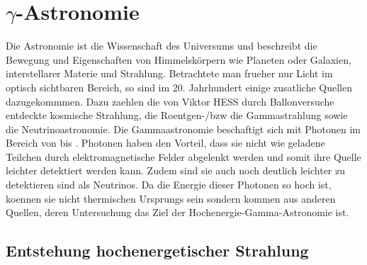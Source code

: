 \chapter{$\gamma$-Astronomie} 
Die Astronomie ist die Wissenschaft des Universums und beschreibt die Bewegung und Eigenschaften von Himmelskörpern wie Planeten oder Galaxien, interstellarer Materie und Strahlung. Betrachtete man frueher nur Licht im optisch sichtbaren Bereich, so sind im 20. Jahrhundert einige zusatliche Quellen dazugekommmen. Dazu zaehlen die von Viktor HESS durch Ballonversuche entdeckte kosmische Strahlung, die Roentgen-/bzw die Gammastrahlung sowie die Neutrinoastronomie. Die Gammaastronomie beschaftigt sich mit Photonen im Bereich von bis . Photonen haben den Vorteil, dass sie nicht wie geladene Teilchen durch elektromagnetische Felder abgelenkt werden und somit ihre Quelle leichter detektiert werden kann. Zudem sind sie auch noch deutlich leichter zu detektieren sind als Neutrinos. Da die Energie dieser Photonen so hoch ist, koennen sie nicht thermischen Ursprungs sein sondern kommen aus anderen Quellen, deren Untersuchung das Ziel der Hochenergie-Gamma-Astronomie ist.


\section{Entstehung hochenergetischer Strahlung}

